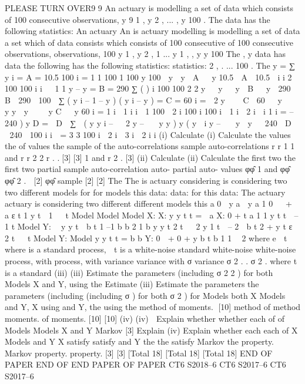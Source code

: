 PLEASE TURN OVER9
9
An actuary is modelling a set of data which consists of 100 consecutive observations,
y 9 1 , y 2 , ... , y 100 . The data has the following statistics:
An actuary
An is
actuary
modelling
is modelling
a set of data
a set which
of data consists
which consists
of 100 consecutive
of 100 consecutive
observations,
observations,
100
y 1 , y 2 , 1 ... y 1 , , y y 100
The
, y data
has data
the following
has the following
statistics: statistics:
2 , . ...
100 . The
y =
∑ y i = A = 10.5
100 i = 1
1 100 1 100
y 100

y  y 
A 
 y 10.5

A  10.5

i
i
2 100
100
i
i


1
1
y – y = B = 290
∑ (
)
i
100
100 2
2
y  
y   y  B
 
y  290
 B  290

100 
∑ ( y i – 1 – y ) ( y i – y ) = C = 60
i =  2 y 
  C  60

 y   y y  y    y C   y 60
i = 1
i  1
i
i  1
100
 2
i 100
i
100
i  1
i  2
i  i 1
i
= – 240
) y D =  D 
∑  ( y y i –   2 y –   y y ) y ( y  i y –   y 
y   240

D 
 240

100
i i  = 3 3
100
i  2
i  3
i  2 i
i
(i) Calculate
(i)
Calculate
the values
the of values
the sample
of the auto-correlations
sample auto-correlations
r r 1 1 and r r 2 2 r . .[3]
[3]
1 and r 2 . [3]
(ii) Calculate
(ii)
Calculate
the first two
the first
two partial
sample auto-correlation
auto-
partial auto- values φφ̂ 1 and φφ̂ φφ̂ 2 .  [2]
φφ̂
sample
[2] [2]
The
The is
actuary
considering
is considering
two
two different
models for
for
models
this data:
data:
for this data:
The actuary
actuary
is
considering
two different
different
models
this
a 0 
y a 
y a 1 0   +  a ε t 1 y t  1   t
Model
Model
Model X:
X:
y y t t = 
a X:
0 + t a 1 1 y t t  –1
t
Model Y:

y y t  b t 1 –1
b b 2 1 b y y t 2 t   2 y 1 t  – 2  b t 2 + y t ε  2 t   t
Model
Y:
Model
y y t t =
b b Y:
0  +
0 + y b t b 1 1 
2
where e  t where
is a standard
process,
 t is a white-noise
standard
white-noise
white-noise
process, with
process,
with variance
variance
with σ
variance
σ 2 . .
σ 2 .
where
t is a standard
(iii)
(iii) Estimate the parameters (including σ 2 2 ) for both
Models X and Y, using the
Estimate
(iii) Estimate
the parameters
the parameters
(including
(including
σ ) for both
σ 2 ) for
Models
both X
Models
and Y, X using
and Y,
the using the
method of moments.
[10]
method of
method
moments.
of moments.
[10]
[10]
(iv)
(iv)
 Explain
whether whether
each of
of Models
Models
X
and Y
Markov
[3]
Explain
(iv)
Explain
whether
each
each of X
Models
and
Y X satisfy
satisfy
and Y the
the
satisfy
Markov
the property.
Markov
property. property.
[3]
[3]
[Total
18]
[Total 18]
[Total 18]
END OF PAPER
END OF
END
PAPER
OF PAPER
CT6 S2018–6
CT6 S2017–6
CT6 S2017–6

